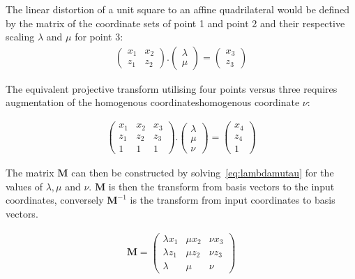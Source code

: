 The linear distortion of a unit square to an affine quadrilateral would be defined by the matrix of the coordinate sets of point 1 and point 2 and their respective scaling \(\lambda \) and \(\mu \) for point 3:
\begin{align}
\begin{pmatrix}
x_1 & x_2 \\
z_1 & z_2
\end{pmatrix}
.
\begin{pmatrix}
\lambda  \\
\mu
\end{pmatrix}
= \begin{pmatrix}
x_3  \\
z_3
\end{pmatrix}
\end{align}

The equivalent projective transform utilising four points versus three requires augmentation of the \gls{homogenous coordinates}{homogenous coordinate} \(\nu \):

\begin{align}
\begin{pmatrix}
x_1 & x_2 & x_3 \\
z_1 & z_2 & z_3 \\
1 & 1 & 1
\end{pmatrix}
.
\begin{pmatrix}
\lambda  \\
\mu \\
\nu
\end{pmatrix}
= \begin{pmatrix}
x_4  \\
z_4 \\
1
\end{pmatrix} \label{eq:lambdamutau}
\end{align}

The matrix \(\textbf{M} \) can then be constructed by solving~\eqref{eq:lambdamutau} for the values of \(\lambda, \mu \) and \(\nu \).
\(\textbf{M} \) is then the transform from basis vectors to the input coordinates, conversely \({\textbf{M}}^{-1}\) is the transform from input coordinates to basis vectors.

\begin{align}
\textbf{M} =
\begin{pmatrix}
\lambda x_1 & \mu x_2 & \nu x_3 \\
\lambda z_1 & \mu z_2 & \nu z_3 \\
\lambda & \mu & \nu
\end{pmatrix}
\end{align}

